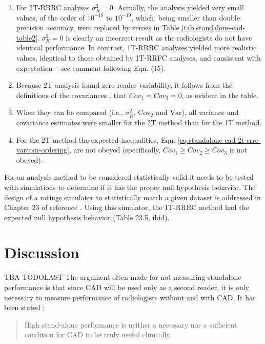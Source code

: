 \documentclass[
]{book}
\providecommand{\tightlist}{%
  \setlength{\itemsep}{0pt}\setlength{\parskip}{0pt}}
\begin{document}
\begin{enumerate}
\def\labelenumi{\arabic{enumi}.}
\tightlist
\item
  For 2T-RRRC analyses \(\sigma_R^2 = 0\). Actually, the analysis yielded very small values, of the order of \(10^{-18}\) to \(10^{-19}\), which, being smaller than double precision accuracy, were replaced by zeroes in Table \ref{tab:standalone-cad-table2}. \(\sigma_R^2 = 0\) is clearly an incorrect result as the radiologists do not have identical performance. In contrast, 1T-RRRC analyses yielded more realistic values, identical to those obtained by 1T-RRFC analyses, and consistent with expectation -- see comment following Eqn. (15).
\item
  Because 2T analysis found zero reader variability, it follows from the definitions of the covariances \citep{obuchowski1995hypothesis}, that \(Cov_1 = Cov_3 = 0\), as evident in the table.
\item
  When they can be compared (i.e., \(\sigma_R^2\), \(\text{Cov}_2\) and \(\text{Var}\)), all variance and covariance estimates were smaller for the 2T method than for the 1T method.
\item
  For the 2T method the expected inequalities, Eqn. \eqref{eq:standalone-cad-2t-rrrc-varcom-ordering}, are not obeyed (specifically, \(Cov_1 \geq Cov_2 \geq Cov_3\) is not obeyed).
\end{enumerate}

For an analysis method to be considered statistically valid it needs to be tested with simulations to determine if it has the proper null hypothesis behavior. The design of a ratings simulator to statistically match a given dataset is addressed in Chapter 23 of reference \citep{chakraborty2017observer}. Using this simulator, the 1T-RRRC method had the expected null hypothesis behavior (Table 23.5, ibid).

\hypertarget{standalone-cad-radiologists-discussion}{%
\section{Discussion}\label{standalone-cad-radiologists-discussion}}

TBA TODOLAST The argument often made for not measuring standalone performance is that since CAD will be used only as a second reader, it is only necessary to measure performance of radiologists without and with CAD. It has been stated \citep{nishikawa2011fundamental}:

\begin{quote}
High stand-alone performance is neither a necessary nor a sufficient condition for CAD to be truly useful clinically.
\end{quote}
\end{document}
